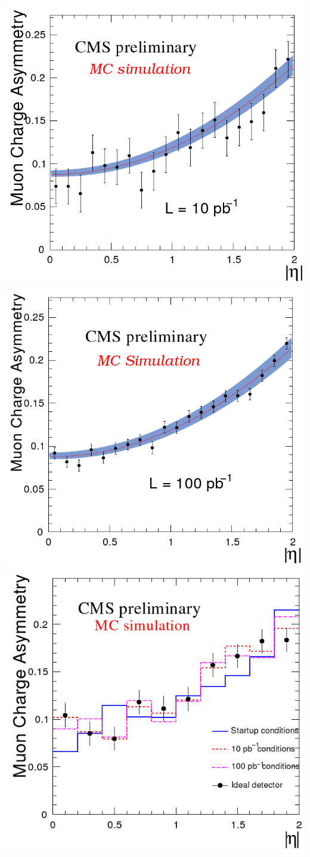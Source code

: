\documentclass[compress]{beamer}
\begin{document}
\begin{frame}
\vfill
\includegraphics[width=0.35\linewidth]{W_chargeasymmetry_10pb-1.png}
\includegraphics[width=0.35\linewidth]{W_chargeasymmetry_100pb-1.png}
\includegraphics[width=0.35\linewidth]{W_chargeasymmetry_conditions.png}
\label{using_standard_model_for_future}
\end{frame}
\end{document}
